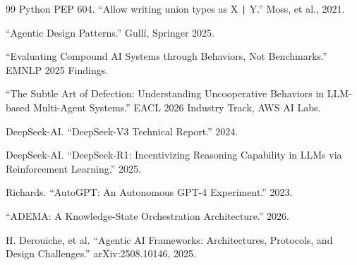 \documentclass[11pt,a4paper]{article}
\begin{document}
\begin{thebibliography}{99}
Python PEP 604. ``Allow writing union types as X \texttt{|} Y.'' Moss, et al., 2021.

``Agentic Design Patterns.'' Gull\'i, Springer 2025.

``Evaluating Compound AI Systems through Behaviors, Not Benchmarks.'' EMNLP 2025 Findings.

``The Subtle Art of Defection: Understanding Uncooperative Behaviors in LLM-based Multi-Agent Systems.'' EACL 2026 Industry Track, AWS AI Labs.

DeepSeek-AI. ``DeepSeek-V3 Technical Report.'' 2024.

DeepSeek-AI. ``DeepSeek-R1: Incentivizing Reasoning Capability in LLMs via Reinforcement Learning.'' 2025.

Richards. ``AutoGPT: An Autonomous GPT-4 Experiment.'' 2023.

``ADEMA: A Knowledge-State Orchestration Architecture.'' 2026.

H. Derouiche, et al. ``Agentic AI Frameworks: Architectures, Protocols, and Design Challenges.'' arXiv:2508.10146, 2025.

\end{thebibliography}
\end{document}
